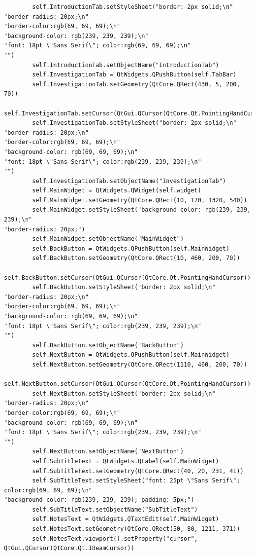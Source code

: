 \documentclass{article}
\begin{document}
\begin{lstlisting}
        self.IntroductionTab.setStyleSheet("border: 2px solid;\n"
"border-radius: 20px;\n"
"border-color:rgb(69, 69, 69);\n"
"background-color: rgb(239, 239, 239);\n"
"font: 18pt \"Sans Serif\"; color:rgb(69, 69, 69);\n"
"")
        self.IntroductionTab.setObjectName("IntroductionTab")
        self.InvestigationTab = QtWidgets.QPushButton(self.TabBar)
        self.InvestigationTab.setGeometry(QtCore.QRect(430, 5, 200, 70))
        self.InvestigationTab.setCursor(QtGui.QCursor(QtCore.Qt.PointingHandCursor))
        self.InvestigationTab.setStyleSheet("border: 2px solid;\n"
"border-radius: 20px;\n"
"border-color:rgb(69, 69, 69);\n"
"background-color: rgb(69, 69, 69);\n"
"font: 18pt \"Sans Serif\"; color:rgb(239, 239, 239);\n"
"")
        self.InvestigationTab.setObjectName("InvestigationTab")
        self.MainWidget = QtWidgets.QWidget(self.widget)
        self.MainWidget.setGeometry(QtCore.QRect(10, 170, 1320, 540))
        self.MainWidget.setStyleSheet("background-color: rgb(239, 239, 239);\n"
"border-radius: 20px;")
        self.MainWidget.setObjectName("MainWidget")
        self.BackButton = QtWidgets.QPushButton(self.MainWidget)
        self.BackButton.setGeometry(QtCore.QRect(10, 460, 200, 70))
        self.BackButton.setCursor(QtGui.QCursor(QtCore.Qt.PointingHandCursor))
        self.BackButton.setStyleSheet("border: 2px solid;\n"
"border-radius: 20px;\n"
"border-color:rgb(69, 69, 69);\n"
"background-color: rgb(69, 69, 69);\n"
"font: 18pt \"Sans Serif\"; color:rgb(239, 239, 239);\n"
"")
        self.BackButton.setObjectName("BackButton")
        self.NextButton = QtWidgets.QPushButton(self.MainWidget)
        self.NextButton.setGeometry(QtCore.QRect(1110, 460, 200, 70))
        self.NextButton.setCursor(QtGui.QCursor(QtCore.Qt.PointingHandCursor))
        self.NextButton.setStyleSheet("border: 2px solid;\n"
"border-radius: 20px;\n"
"border-color:rgb(69, 69, 69);\n"
"background-color: rgb(69, 69, 69);\n"
"font: 18pt \"Sans Serif\"; color:rgb(239, 239, 239);\n"
"")
        self.NextButton.setObjectName("NextButton")
        self.SubTitleText = QtWidgets.QLabel(self.MainWidget)
        self.SubTitleText.setGeometry(QtCore.QRect(40, 20, 231, 41))
        self.SubTitleText.setStyleSheet("font: 25pt \"Sans Serif\"; color:rgb(69, 69, 69);\n"
"background-color: rgb(239, 239, 239); padding: 5px;")
        self.SubTitleText.setObjectName("SubTitleText")
        self.NotesText = QtWidgets.QTextEdit(self.MainWidget)
        self.NotesText.setGeometry(QtCore.QRect(50, 80, 1211, 371))
        self.NotesText.viewport().setProperty("cursor", QtGui.QCursor(QtCore.Qt.IBeamCursor))

\end{lstlisting}
\end{document}
